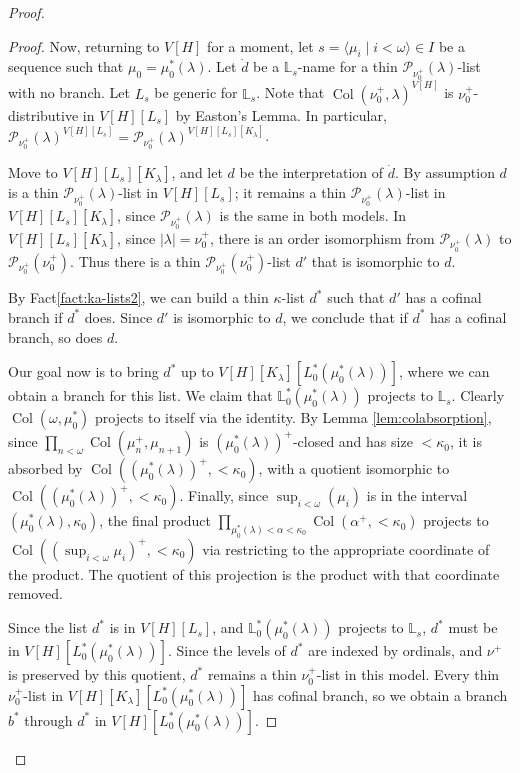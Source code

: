 \documentclass[psamsfonts]{amsart}
\theoremstyle{definition}
\newcommand{\LL}{\mathbb{L}}
\newcommand{\la}{\lambda}
\newcommand{\ka}{\kappa}
\newcommand{\w}{\omega}
\newcommand{\mc}{\mathcal}
\DeclareMathOperator{\Coll}{Col}
\numberwithin{equation}{section}
\begin{document}
\begin{proof}
\begin{proof}
		Now, returning to $V[H]$ for a moment, let $s = \langle \mu_i \mid i < \w\rangle \in I$ be a sequence such that $\mu_0 = \mu^*_0(\la)$. Let $\dot{d}$ be a $\LL_s$-name for a thin $\mc{P}_{\nu_0^+}(\la)$-list with no branch. Let $L_s$ be generic for $\LL_s$. Note that $\Coll(\nu_0^+, \la)^{V[H]}$ is $\nu_0^+$-distributive in $V[H][L_s]$ by Easton's Lemma. In particular, $\mc{P}_{\nu_0^+}(\la)^{V[H][L_s]} = \mc{P}_{\nu_0^+}(\la)^{V[H][L_s][K_\la]}$.
		
		Move to $V[H][L_s][K_\la]$, and let $d$ be the interpretation of $\dot{d}$. By assumption $d$ is a thin $\mc{P}_{\nu_0^+}(\la)$-list in $V[H][L_s]$; it remains a thin $\mc{P}_{\nu_0^+}(\la)$-list in $V[H][L_s][K_\la]$, since $\mc{P}_{\nu_0^+}(\la)$ is the same in both models. In $V[H][L_s][K_\la]$, since $|\la| = \nu_0^+$, there is an order isomorphism from $\mc{P}_{\nu_0^+}(\la)$ to $\mc{P}_{\nu_0^+}(\nu_0^+)$. Thus there is a thin $\mc{P}_{\nu_0^+}(\nu_0^+)$-list $d'$ that is isomorphic to $d$.
		
		By Fact\ref{fact:ka-lists2}, we can build a thin $\ka$-list $d^*$ such that $d'$ has a cofinal branch if $d^*$ does. Since $d'$ is isomorphic to $d$, we conclude that if $d^*$ has a cofinal branch, so does $d$.
		
		Our goal now is to bring $d^*$ up to $V[H][K_\la][L^*_0(\mu^*_0(\la))]$, where we can obtain a branch for this list. We claim that $\LL_0^*(\mu^*_0(\la))$ projects to $\LL_s$. Clearly $\Coll(\w,\mu^*_0)$ projects to itself via the identity. By Lemma \ref{lem:colabsorption}, since $\prod_{n<\w} \Coll(\mu_{n}^+, \mu_{n+1})$ is $(\mu^*_0(\la))^+$-closed and has size $<\ka_0$, it is absorbed by $\Coll((\mu^*_0(\la))^+, <\ka_0)$, with a quotient isomorphic to $\Coll((\mu^*_0(\la))^+, <\ka_0)$. Finally, since $\sup_{i<\w}(\mu_i)$ is in the interval $(\mu^*_0(\la), \ka_0)$, the final product $\prod_{\mu^*_0(\la) < \alpha < \ka_0} \Coll(\alpha^+, <\ka_0)$ projects to $\Coll((\sup_{i<\w}\mu_i)^+, <\ka_0)$ via restricting to the appropriate coordinate of the product. The quotient of this projection is the product with that coordinate removed.
		
		Since the list $d^*$ is in $V[H][L_s]$, and $\LL_0^*(\mu^*_0(\la))$ projects to $\LL_s$, $d^*$ must be in $V[H][L_0^*(\mu^*_0(\la))]$. Since the levels of $d^*$ are indexed by ordinals, and $\nu^+$ is preserved by this quotient, $d^*$ remains a thin $\nu_0^+$-list in this model. Every thin $\nu_0^+$-list in $V[H][K_\la][L_0^*(\mu_0^*(\la))]$ has cofinal branch, so we obtain a branch $b^*$ through $d^*$ in $V[H][L_0^*(\mu^*_0(\la))]$.
		

\end{proof}
\end{proof}
\end{document}
